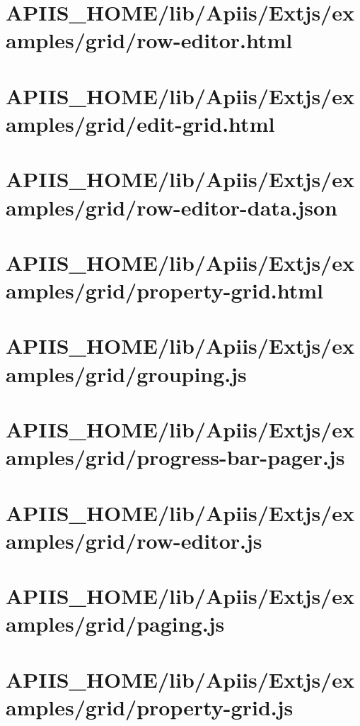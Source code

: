 \section{APIIS\_HOME/lib/Apiis/Extjs/examples/grid/row-editor.html} 
\section{APIIS\_HOME/lib/Apiis/Extjs/examples/grid/edit-grid.html} 
\section{APIIS\_HOME/lib/Apiis/Extjs/examples/grid/row-editor-data.json} 
\section{APIIS\_HOME/lib/Apiis/Extjs/examples/grid/property-grid.html} 
\section{APIIS\_HOME/lib/Apiis/Extjs/examples/grid/grouping.js} 
\section{APIIS\_HOME/lib/Apiis/Extjs/examples/grid/progress-bar-pager.js} 
\section{APIIS\_HOME/lib/Apiis/Extjs/examples/grid/row-editor.js} 
\section{APIIS\_HOME/lib/Apiis/Extjs/examples/grid/paging.js} 
\section{APIIS\_HOME/lib/Apiis/Extjs/examples/grid/property-grid.js} 
